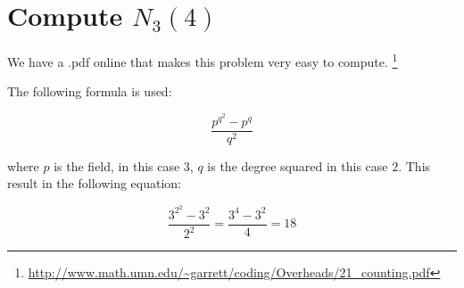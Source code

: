 \documentclass{article}
\begin{document}

\section{Compute $N_3(4)$} 

We have a .pdf online that makes this problem very easy to compute.
\footnote{\url{http://www.math.umn.edu/~garrett/coding/Overheads/21_counting.pdf}}

The following formula is used:

\[
\frac{p^{q^2} - p^q}{q^2}
\]

where $p$ is the field, in this case $3$, $q$ is the degree squared in this case $2$.
This result in the following equation:

\[
\frac{3^{2^2} - 3^2}{2^2} = \frac{3^4 - 3^2}{4} = 18
\]
\end{document}

